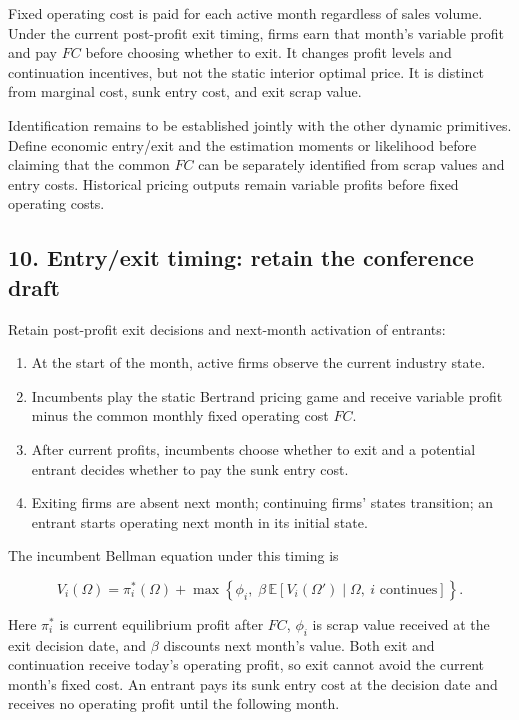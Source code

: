 \documentclass[10pt,]{article}
\providecommand{\tightlist}{%
  \setlength{\itemsep}{0pt}\setlength{\parskip}{0pt}}
\begin{document}
Fixed operating cost is paid for each active month regardless of sales
volume. Under the current post-profit exit timing, firms earn that
month's variable profit and pay \(FC\) before choosing whether to exit.
It changes profit levels and continuation incentives, but not the static
interior optimal price. It is distinct from marginal cost, sunk entry
cost, and exit scrap value.

Identification remains to be established jointly with the other dynamic
primitives. Define economic entry/exit and the estimation moments or
likelihood before claiming that the common \(FC\) can be separately
identified from scrap values and entry costs. Historical pricing outputs
remain variable profits before fixed operating costs.

\subsection{10. Entry/exit timing: retain the conference
draft}\label{entryexit-timing-retain-the-conference-draft}

Retain post-profit exit decisions and next-month activation of entrants:

\begin{enumerate}
\def\labelenumi{\arabic{enumi}.}
\tightlist
\item
  At the start of the month, active firms observe the current industry
  state.
\item
  Incumbents play the static Bertrand pricing game and receive variable
  profit minus the common monthly fixed operating cost \(FC\).
\item
  After current profits, incumbents choose whether to exit and a
  potential entrant decides whether to pay the sunk entry cost.
\item
  Exiting firms are absent next month; continuing firms' states
  transition; an entrant starts operating next month in its initial
  state.
\end{enumerate}

The incumbent Bellman equation under this timing is

\[
V_i(\Omega)=\pi_i^*(\Omega)+\max\left\{\phi_i,\;\beta\,\mathbb{E}[V_i(\Omega')\mid\Omega,\ i\text{ continues}]\right\}.
\]

Here \(\pi_i^*\) is current equilibrium profit after \(FC\), \(\phi_i\)
is scrap value received at the exit decision date, and \(\beta\)
discounts next month's value. Both exit and continuation receive today's
operating profit, so exit cannot avoid the current month's fixed cost.
An entrant pays its sunk entry cost at the decision date and receives no
operating profit until the following month.
\end{document}
